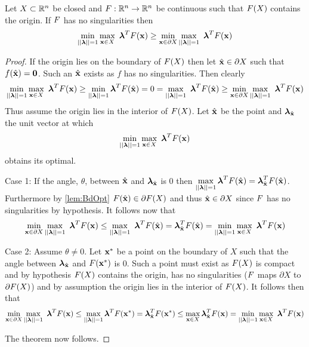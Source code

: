 \begin{thm} 
\label{thm:MainIneq}
Let $X\subset\mathbb{R}^n$ be closed and $F:\mathbb{R}^n\rightarrow\mathbb{R}^n$ be continuous such that $F(X)$ contains the origin. 
If $F$ has no singularities then $$\min\limits_{||\boldsymbol{\lambda}||=1}\max\limits_{\vx\in X}\ \boldsymbol{\lambda}^T\vF(\vx)\geq \min\limits_{\vx\in \partial X}\max\limits_{||\boldsymbol{\lambda}||=1}\ \boldsymbol{\lambda}^T\vF(\vx)$$
\begin{proof}
If the origin lies on the boundary of $F(X)$ then let $\hat{\mathbf{x}}\in \partial X$ such that $f(\hat{\mathbf{x}})=\textbf{0}$. 
Such an $\hat{\mathbf{x}}$ exists as $f$ has no singularities. 
Then  clearly $$\min\limits_{||\boldsymbol{\lambda}||=1}\max\limits_{\vx\in X}\ \boldsymbol{\lambda}^T\vF(\vx)\geq \min\limits_{||\boldsymbol{\lambda}||=1}\boldsymbol{\lambda}^T\vF(\hat{\vx})= 0 = \max\limits_{||\boldsymbol{\lambda}||=1}\ \boldsymbol{\lambda}^T\vF(\hat{\vx}) \geq \min\limits_{\vx\in \partial X}\max\limits_{||\boldsymbol{\lambda}||=1}\ \boldsymbol{\lambda}^T\vF(\vx)$$
Thus assume the origin lies in the interior of $F(X)$.
Let $\hat{\mathbf{x}}$ be the point and $\boldsymbol{\lambda}_{\hat{\mathbf{x}}}$ the unit vector at which $$\min\limits_{||\boldsymbol{\lambda}||=1}\max\limits_{\mathbf{x}\in X}\ \boldsymbol{\lambda}^TF(\mathbf{x})$$
obtains its optimal. 

Case 1: If the angle, $\theta$, between $\hat{\mathbf{x}}$ and $\boldsymbol{\lambda}_{\hat{\mathbf{x}}}$ is 0 then $\max\limits_{||\boldsymbol{\lambda}||=1}\boldsymbol{\lambda}^TF(\hat{\mathbf{x}})=\boldsymbol{\lambda}_{\hat{\mathbf{x}}}^TF(\hat{\mathbf{x}})$. 
Furthermore by \cref{lem:BdOpt} $F(\hat{\mathbf{x}})\in \partial F(X)$ and thus $\hat{\mathbf{x}}\in \partial X$ since $F$ has no singularities by hypothesis. 
It follows now that $$\min\limits_{\vx\in \partial X}\max\limits_{||\boldsymbol{\lambda}||=1}\ \boldsymbol{\lambda}^T\vF(\vx)\leq \max\limits_{||\boldsymbol{\lambda}||=1}\ \boldsymbol{\lambda}^T\vF(\hat{\vx})=\boldsymbol{\lambda}_{\hat{\vx}}^T\vF(\hat{\vx})=\min\limits_{||\boldsymbol{\lambda}||=1}\max\limits_{\vx\in X}\ \boldsymbol{\lambda}^T\vF(\vx)$$

Case 2: Assume $\theta \neq 0$. 
Let $\mathbf{x}^*$ be a point on the boundary of $X$ such that the angle between $\boldsymbol{\lambda}_{\hat{\mathbf{x}}}$ and $F(\mathbf{x}^*)$ is 0. 
Such a point must exist as $F(X)$ is compact and by hypothesis $F(X)$ contains the origin, has no singularities ($F$ maps $\partial X$ to $\partial F(X)$) and by assumption the origin lies in the interior of $F(X)$. 
It follows then that $$\min\limits_{\vx\in \partial X}\max\limits_{||\boldsymbol{\lambda}||=1}\ \boldsymbol{\lambda}^T\vF(\vx)\leq \max\limits_{||\boldsymbol{\lambda}||=1}\boldsymbol{\lambda}^T \vF(\vx^*) =\boldsymbol{\lambda}_{\hat{\vx}}^T\vF(\vx^*)\leq \max\limits_{\vx\in X}\boldsymbol{\lambda}_{\hat{\vx}}^T\vF(\vx)=\min\limits_{||\boldsymbol{\lambda}||=1}\max\limits_{\vx\in X}\ \boldsymbol{\lambda}^T\vF(\vx)$$

The theorem now follows.
\end{proof}
\end{thm}

